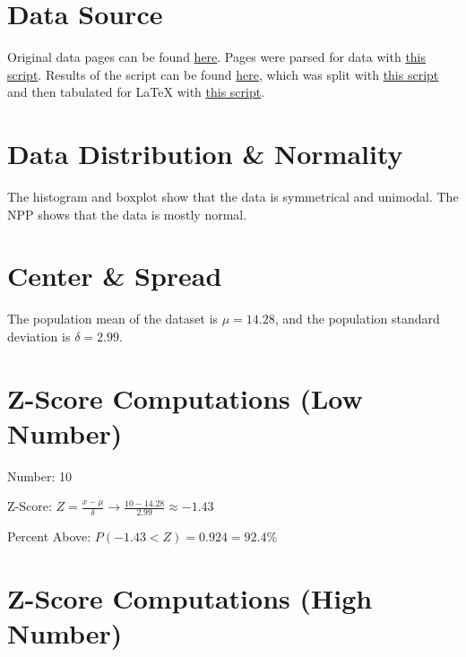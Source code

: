 \documentclass[a4paper]{article}
\begin{document}
\section{Data Source}

Original data pages can be found \href{https://github.com/karagenit/bestiary/tree/master/_posts}{here}. Pages were parsed for data with \href{https://github.com/karagenit/dnd-ac/blob/master/script.rb}{this script}. Results of the script can be found \href{https://docs.google.com/spreadsheets/d/1GczVGTTNPxHVgNRFSQclzjwKyO30wLdCg6uDStq-raQ/edit?usp=sharing}{here}, which was split with \href{https://github.com/karagenit/csv-split/blob/master/script.rb}{this script} and then tabulated for LaTeX with \href{https://github.com/karagenit/csv-latex-table/blob/master/script.sh}{this script}.

\section{Data Distribution \& Normality}


The histogram and boxplot show that the data is symmetrical and unimodal. The NPP shows that the data is mostly normal. 

\section{Center \& Spread}

The population mean of the dataset is $\mu = 14.28$, and the population standard deviation is $\delta = 2.99$. 

\section{Z-Score Computations (Low Number)}


Number: 10

Z-Score: $Z = \frac{x-\mu}{\delta}\rightarrow\frac{10-14.28}{2.99}\approx-1.43$

Percent Above: $P(-1.43 < Z) = 0.924 = 92.4\%$

\section{Z-Score Computations (High Number)}
\end{document}
